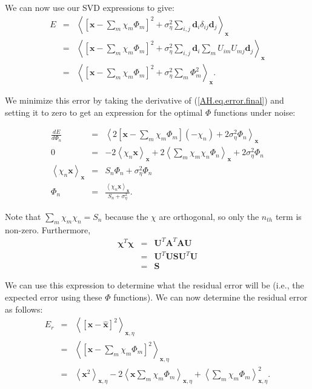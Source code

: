 \documentclass[10pt,letterpaper,oneside]{article}
\begin{document}
We can now use our SVD expressions to give:
\begin{eqnarray}
E & = & \left\langle \left[\mathbf{x}-\sum_{m}\chi_{m}\Phi_{m}\right]^{2}+\sigma_{\eta}^{2}\sum_{i,j}\mathbf{d}_{i}\delta_{ij}\mathbf{d}_{j}\right\rangle _{\mathbf{x}}\nonumber \\
 & = & \left\langle \left[\mathbf{x}-\sum_{m}\chi_{m}\Phi_{m}\right]^{2}+\sigma_{\eta}^{2}\sum_{i,j}\mathbf{d}_{i}\sum_{m}U_{im}U_{mj}\mathbf{d}_{j}\right\rangle _{\mathbf{x}}\nonumber \\
 & = & \left\langle \left[\mathbf{x}-\sum_{m}\chi_{m}\Phi_{m}\right]^{2}+\sigma_{\eta}^{2}\sum_{m}\Phi_{m}^{2}\right\rangle _{\mathbf{x}}.\label{AH.eq.error.final}
\end{eqnarray}

We minimize this error by taking the derivative of (\ref{AH.eq.error.final})
and setting it to zero to get an expression for the optimal $\Phi$
functions under noise: 

\begin{eqnarray}
\frac{dE}{d\Phi_{n}} & = & \left\langle 2\left[\mathbf{x}-\sum_{m}\chi_{m}\Phi_{m}\right](-\chi_{n})+2\sigma_{\eta}^{2}\Phi_{n}\right\rangle _{\mathbf{x}}\nonumber \\
0 & = & -2\left\langle \chi_{n}\mathbf{x}\right\rangle _{\mathbf{x}}+2\left\langle \sum_{m}\chi_{m}\chi_{n}\Phi_{n}\right\rangle _{\mathbf{x}}+2\sigma_{\eta}^{2}\Phi_{n}\nonumber \\
\left\langle \chi_{n}\mathbf{x}\right\rangle _{\mathbf{x}} & = & S_{n}\Phi_{n}+\sigma_{\eta}^{2}\Phi_{n}\nonumber \\
\Phi_{n} & = & \frac{\left\langle \chi_{n}\mathbf{x}\right\rangle _{\mathbf{x}}}{S_{n}+\sigma_{\eta}^{2}}.\label{AH.eq.Phi2}
\end{eqnarray}

Note that $\sum_m \chi_m \chi_n = S_n$ because the $\chi$ are orthogonal, so only the $n_{th}$ term is non-zero. Furthermore, 
\begin{eqnarray*}
  \mathbf{\chi}^T \mathbf{\chi} &=& \mathbf{U}^T \mathbf{A}^T \mathbf{A} \mathbf{U} \\
  &=& \mathbf{U}^T \mathbf{U} \mathbf{S} \mathbf{U}^T \mathbf{U} \\
  &=& \mathbf{S}
\end{eqnarray*}

We can use this expression to determine what the residual error will
be (i.e., the expected error using these $\Phi$ functions). We can now determine the residual error as follows:
\begin{eqnarray*}
E_{r} & = & \left\langle \left[\mathbf{x}-\hat{\mathbf{x}}\right]^{2}\right\rangle _{\mathbf{x},\eta}\\
 & = & \left\langle \left[\mathbf{x}-\sum_{m}\chi_{m}\Phi_{m}\right]^{2}\right\rangle _{\mathbf{x},\eta}\\
 & = & \left\langle \mathbf{x}^{2}\right\rangle _{\mathbf{x},\eta}-2\left\langle \mathbf{x}\sum_{m}\chi_{m}\Phi_{m}\right\rangle _{\mathbf{x},\eta}+\left\langle \sum_{m}\chi_{m}\Phi_{m}\right\rangle _{\mathbf{x},\eta}^{2}.
\end{eqnarray*}
\end{document}
